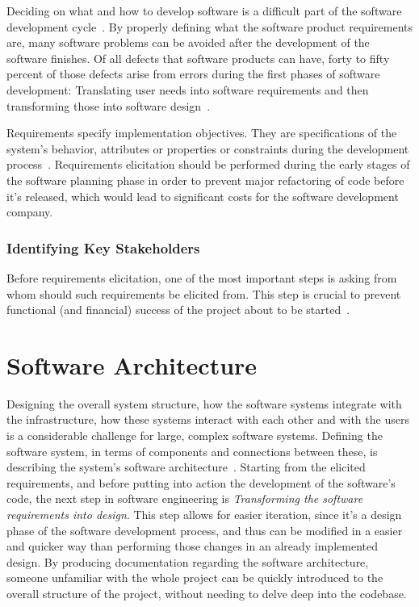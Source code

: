 Deciding on what and how to develop software is a difficult part of the software development cycle~\Parencite{pacheco_garcía_reyes_2018}.
By properly defining what the software product requirements are, many software problems can be avoided after the development of the software finishes. Of all defects that software products can have, forty to fifty percent of those defects arise from errors during the first phases of software development: Translating user needs into software requirements and then transforming those into software design~\Parencite{eugene_wiegers_beatty_2013}. 

Requirements specify implementation objectives. They are specifications of the system's behavior, attributes or properties or constraints during the development process~\Parencite{sommerville_sawyer_1997}. Requirements elicitation should be performed during the early stages of the software planning phase in order to prevent major refactoring of code before it's released, which would lead to significant costs for the software development company.

\subsubsection{Identifying Key Stakeholders}\label{state-of-the-art:sss:identifying-key-stakeholders}

Before requirements elicitation, one of the most important steps is asking from whom should such requirements be elicited from. This step is crucial to prevent functional (and financial) success of the project about to be started~\Parencite{lewellen_2020}.


\section{Software Architecture}\label{state-of-the-art:s:software-architecture}

Designing the overall system structure, how the software systems integrate with the infrastructure, how these systems interact with each other and with the users is a considerable challenge for large, complex software systems. Defining the software system, in terms of components and connections between these, is describing the system's software architecture~\Parencite{hasselbring2018software}. Starting from the elicited requirements, and before putting into action the development of the software's code, the next step in software engineering is \textit{Transforming the software requirements into design}. This step allows for easier iteration, since it's a design phase of the software development process, and thus can be modified in a easier and quicker way than performing those changes in an already implemented design.
By producing documentation regarding the software architecture, someone unfamiliar with the whole project can be quickly introduced to the overall structure of the project, without needing to delve deep into the codebase.

